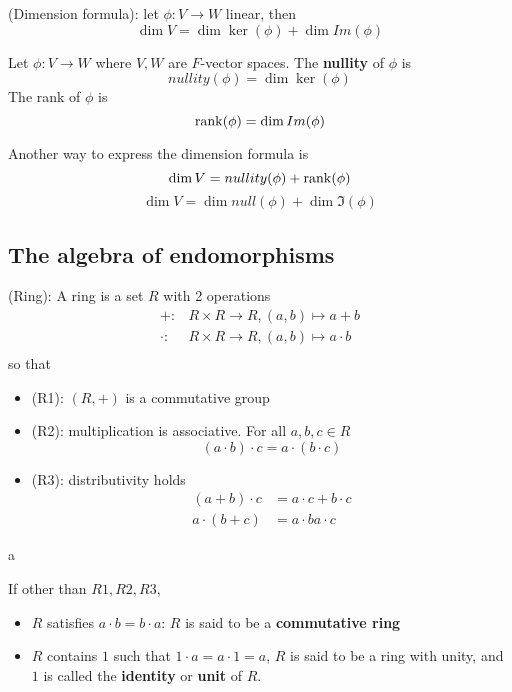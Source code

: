 \begin{corollary}
    (Dimension formula): let $\phi: V \to W$  linear, then 
    \[
        \dim V = \dim \ker( \phi) + \dim Im(\phi)
    \]
\end{corollary}

\begin{definition}
    Let $\phi: V \to W$ where $V, W$ are $F$-vector spaces. The \textbf{nullity} of $\phi$ is 
    \[
        nullity(\phi) = \dim \ker(\phi)
    \]
    The rank of $\phi$ is 
    \[
        \rank(\phi) = \dim Im(\phi)
    \]
\end{definition}

\begin{remark}
    Another way to express the dimension formula is 
    \[
        \dim V = nullity(\phi) + \rank (\phi)
    \]
    \[
        \dim V = \dim null(\phi) + \dim \Im(\phi)
    \]
\end{remark}

\subsection{The algebra of endomorphisms} 

\begin{definition}
    (Ring): A ring is a set $R$ with 2 operations 
    \begin{align*}
        +: & R \times R \to R, (a, b) \mapsto a + b \\
        \cdot: & R \times R \to R, (a, b) \mapsto a \cdot b \\
    \end{align*}
    so that 
    \begin{itemize}
        \item (R1): $(R, +)$ is a commutative group 
        \item (R2): multiplication is associative. For all $a, b, c \in R$
        \[
            (a \cdot b) \cdot c = a \cdot (b \cdot c)
        \]
        \item (R3): distributivity holds 
        \begin{align*}
            (a + b) \cdot c &= a \cdot c + b \cdot c \\
            a \cdot ( b + c) &= a\cdot b a \cdot c
        \end{align*}
    \end{itemize}a

    If other than $R1, R2, R3$, 
    \begin{itemize}
        \item $R$ satisfies $a \cdot b = b \cdot a$: $R$ is said to be a \textbf{commutative ring} 
        \item $R$ contains $1$ such that $1 \cdot a = a \cdot 1 = a$, $R$ is said to be a ring with unity, and $1$ is called the \textbf{identity} or \textbf{unit} of $R$.
    \end{itemize}
\end{definition}


